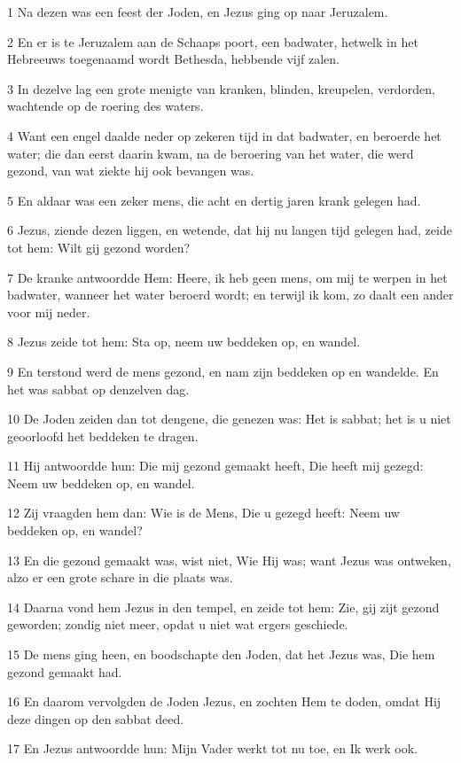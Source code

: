 \par 1 Na dezen was een feest der Joden, en Jezus ging op naar Jeruzalem.
\par 2 En er is te Jeruzalem aan de Schaaps poort, een badwater, hetwelk in het Hebreeuws toegenaamd wordt Bethesda, hebbende vijf zalen.
\par 3 In dezelve lag een grote menigte van kranken, blinden, kreupelen, verdorden, wachtende op de roering des waters.
\par 4 Want een engel daalde neder op zekeren tijd in dat badwater, en beroerde het water; die dan eerst daarin kwam, na de beroering van het water, die werd gezond, van wat ziekte hij ook bevangen was.
\par 5 En aldaar was een zeker mens, die acht en dertig jaren krank gelegen had.
\par 6 Jezus, ziende dezen liggen, en wetende, dat hij nu langen tijd gelegen had, zeide tot hem: Wilt gij gezond worden?
\par 7 De kranke antwoordde Hem: Heere, ik heb geen mens, om mij te werpen in het badwater, wanneer het water beroerd wordt; en terwijl ik kom, zo daalt een ander voor mij neder.
\par 8 Jezus zeide tot hem: Sta op, neem uw beddeken op, en wandel.
\par 9 En terstond werd de mens gezond, en nam zijn beddeken op en wandelde. En het was sabbat op denzelven dag.
\par 10 De Joden zeiden dan tot dengene, die genezen was: Het is sabbat; het is u niet geoorloofd het beddeken te dragen.
\par 11 Hij antwoordde hun: Die mij gezond gemaakt heeft, Die heeft mij gezegd: Neem uw beddeken op, en wandel.
\par 12 Zij vraagden hem dan: Wie is de Mens, Die u gezegd heeft: Neem uw beddeken op, en wandel?
\par 13 En die gezond gemaakt was, wist niet, Wie Hij was; want Jezus was ontweken, alzo er een grote schare in die plaats was.
\par 14 Daarna vond hem Jezus in den tempel, en zeide tot hem: Zie, gij zijt gezond geworden; zondig niet meer, opdat u niet wat ergers geschiede.
\par 15 De mens ging heen, en boodschapte den Joden, dat het Jezus was, Die hem gezond gemaakt had.
\par 16 En daarom vervolgden de Joden Jezus, en zochten Hem te doden, omdat Hij deze dingen op den sabbat deed.
\par 17 En Jezus antwoordde hun: Mijn Vader werkt tot nu toe, en Ik werk ook.

